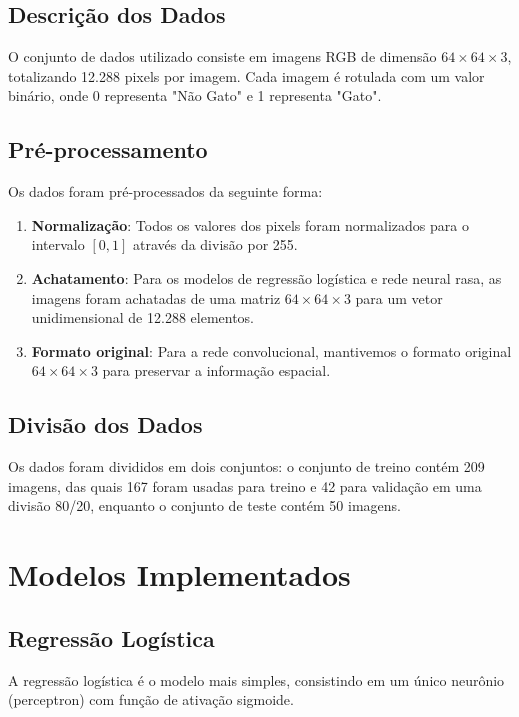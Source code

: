\documentclass[a4paper,12pt]{article}
\begin{document}
\subsection{Descrição dos Dados}

O conjunto de dados utilizado consiste em imagens RGB de dimensão $64 \times 64 \times 3$, totalizando 12.288 pixels por imagem. Cada imagem é rotulada com um valor binário, onde 0 representa "Não Gato" e 1 representa "Gato".

\subsection{Pré-processamento}

Os dados foram pré-processados da seguinte forma:
\begin{enumerate}
    \item \textbf{Normalização}: Todos os valores dos pixels foram normalizados para o intervalo $[0, 1]$ através da divisão por 255.
    \item \textbf{Achatamento}: Para os modelos de regressão logística e rede neural rasa, as imagens foram achatadas de uma matriz $64 \times 64 \times 3$ para um vetor unidimensional de 12.288 elementos.
    \item \textbf{Formato original}: Para a rede convolucional, mantivemos o formato original $64 \times 64 \times 3$ para preservar a informação espacial.
\end{enumerate}

\subsection{Divisão dos Dados}

Os dados foram divididos em dois conjuntos: o conjunto de treino contém 209 imagens, das quais 167 foram usadas para treino e 42 para validação em uma divisão 80/20, enquanto o conjunto de teste contém 50 imagens.

\section{Modelos Implementados}
\label{sec:modelos}

\subsection{Regressão Logística}
\label{subsec:regressao}

A regressão logística é o modelo mais simples, consistindo em um único neurônio (perceptron) com função de ativação sigmoide.
\end{document}
